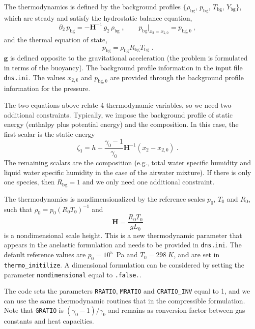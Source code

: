The thermodynamics is defined by the background profiles $\{\rho_\mathrm{bg},\, p_\mathrm{bg},\, T_\mathrm{bg},\, Y_\mathrm{bg}\}$, which are steady and satisfy the hydrostatic balance equation,
\begin{equation}
    \partial_2\,p_\mathrm{bg}=-\mathbf{H}^{-1}\, g_2\,\rho_\mathrm{bg}\;,\qquad p_\mathrm{bg}|_{x_2=x_{2,0}}=p_{\mathrm{bg},0}\;,
\end{equation}
and the thermal equation of state,
\begin{equation}
    p_\mathrm{bg}  = \rho_\mathrm{bg} R_\mathrm{bg} T_\mathrm{bg} \;.
\end{equation}
$\mathbf{g}$ is defined opposite to the gravitational acceleration (the problem is formulated in terms of the buoyancy). The background profile information in the input file {\tt dns.ini}. The values $x_{2,0}$ and $p_\mathrm{bg,0}$ are provided through the background profile information for the pressure. 

The two equations above relate 4 thermodynamic variables, so we need two additional constraints. Typically, we impose the background profile of static energy (enthalpy plus potential energy) and the composition. In this case, the first scalar is the static energy
\begin{equation}
    \zeta_1 = h + \frac{\gamma_0-1}{\gamma_0}\mathbf{H}^{-1}(x_2-x_{2,0}) \;.
\end{equation}
The remaining scalars are the composition (e.g., total water specific humidity and liquid water specific humidity in the case of the airwater mixture). If there is only one species, then $R_\mathrm{bg}=1$ and we only need one additional constraint. 

The thermodynamics is nondimensionalized by the reference scales $p_0$, $T_0$ and $R_0$, such that $\rho_0=p_0(R_0T_0)^{-1}$ and
\begin{equation}
    \mathbf{H} = \frac{R_0T_0}{gL_0}
\end{equation}
is a nondimensional scale height. This is a new thermodynamic parameter that appears in the anelastic formulation and needs to be provided in \texttt{dns.ini}. The default reference values are $p_0=10^5$~Pa and $T_0=298~K$, and are set in \texttt{thermo\_initilize}. A dimensional formulation can be considered by setting the parameter \texttt{nondimensional} equal to \texttt{.false.}.

The code sets the parameters \texttt{RRATIO}, \texttt{MRATIO} and \texttt{CRATIO\_INV} equal to 1, and we can use the same thermodynamic routines that in the compressible formulation. Note that \texttt{GRATIO} is $(\gamma_0-1)/\gamma_0$ and remains as conversion factor between gas constants and heat capacities.

